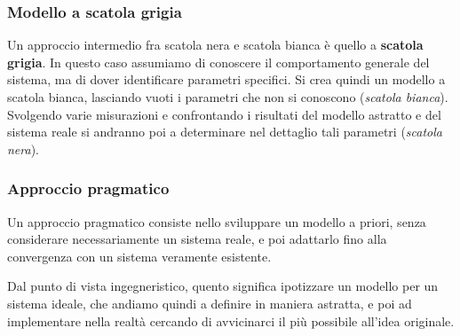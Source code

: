 \documentclass[a4paper,11pt]{article}
\begin{document}
\subsubsection{Modello a scatola grigia}
Un approccio intermedio fra scatola nera e scatola bianca è quello a \textbf{scatola grigia}.
In questo caso assumiamo di conoscere il comportamento generale del sistema, ma di dover identificare parametri specifici.
Si crea quindi un modello a scatola bianca, lasciando vuoti i parametri che non si conoscono (\textit{scatola bianca}). 
Svolgendo varie misurazioni e confrontando i risultati del modello astratto e del sistema reale si andranno poi a determinare nel dettaglio tali parametri (\textit{scatola nera}).

\subsubsection{Approccio pragmatico}
Un approccio pragmatico consiste nello sviluppare un modello a priori, senza considerare necessariamente un sistema reale, e poi adattarlo fino alla convergenza con un sistema veramente esistente.

Dal punto di vista ingegneristico, quento significa ipotizzare un modello per un sistema ideale, che andiamo quindi a definire in maniera astratta, e poi ad implementare nella realtà cercando di avvicinarci il più possibile all'idea originale. 
\end{document}
